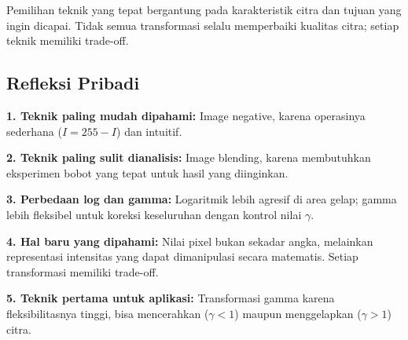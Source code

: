 \documentclass[12pt,a4paper]{article}
\begin{document}
Pemilihan teknik yang tepat bergantung pada karakteristik citra dan tujuan yang ingin dicapai.
Tidak semua transformasi selalu memperbaiki kualitas citra; setiap teknik memiliki trade-off.

\subsection{Refleksi Pribadi}

\textbf{1. Teknik paling mudah dipahami:} Image negative, karena operasinya sederhana
($I = 255 - I$) dan intuitif.

\textbf{2. Teknik paling sulit dianalisis:} Image blending, karena membutuhkan eksperimen
bobot yang tepat untuk hasil yang diinginkan.

\textbf{3. Perbedaan log dan gamma:} Logaritmik lebih agresif di area gelap; gamma lebih
fleksibel untuk koreksi keseluruhan dengan kontrol nilai $\gamma$.

\textbf{4. Hal baru yang dipahami:} Nilai pixel bukan sekadar angka, melainkan representasi
intensitas yang dapat dimanipulasi secara matematis. Setiap transformasi memiliki trade-off.

\textbf{5. Teknik pertama untuk aplikasi:} Transformasi gamma karena fleksibilitasnya tinggi,
bisa mencerahkan ($\gamma < 1$) maupun menggelapkan ($\gamma > 1$) citra.
\end{document}
